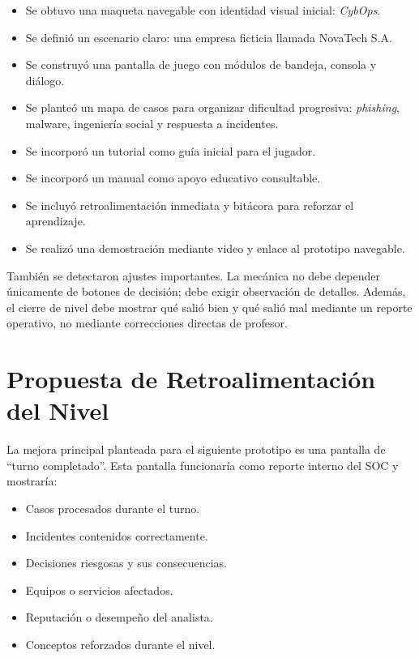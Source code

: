 ﻿\documentclass[12pt]{article}
\begin{document}
\begin{itemize}
    \item Se obtuvo una maqueta navegable con identidad visual inicial: \textit{CybOps}.
    \item Se defini\'{o} un escenario claro: una empresa ficticia llamada NovaTech S.A.
    \item Se construy\'{o} una pantalla de juego con m\'{o}dulos de bandeja, consola y di\'{a}logo.
    \item Se plante\'{o} un mapa de casos para organizar dificultad progresiva: \textit{phishing}, malware, ingenier\'{i}a social y respuesta a incidentes.
    \item Se incorpor\'{o} un tutorial como gu\'{i}a inicial para el jugador.
    \item Se incorpor\'{o} un manual como apoyo educativo consultable.
    \item Se incluy\'{o} retroalimentaci\'{o}n inmediata y bit\'{a}cora para reforzar el aprendizaje.
    \item Se realiz\'{o} una demostraci\'{o}n mediante video y enlace al prototipo navegable.
\end{itemize}

Tambi\'{e}n se detectaron ajustes importantes. La mec\'{a}nica no debe depender \'{u}nicamente de botones de decisi\'{o}n; debe exigir observaci\'{o}n de detalles. Adem\'{a}s, el cierre de nivel debe mostrar qu\'{e} sali\'{o} bien y qu\'{e} sali\'{o} mal mediante un reporte operativo, no mediante correcciones directas de profesor.

\section{Propuesta de Retroalimentaci\'{o}n del Nivel}

La mejora principal planteada para el siguiente prototipo es una pantalla de ``turno completado''. Esta pantalla funcionar\'{i}a como reporte interno del SOC y mostrar\'{i}a:

\begin{itemize}
    \item Casos procesados durante el turno.
    \item Incidentes contenidos correctamente.
    \item Decisiones riesgosas y sus consecuencias.
    \item Equipos o servicios afectados.
    \item Reputaci\'{o}n o desempe\~{n}o del analista.
    \item Conceptos reforzados durante el nivel.
\end{itemize}
\end{document}
